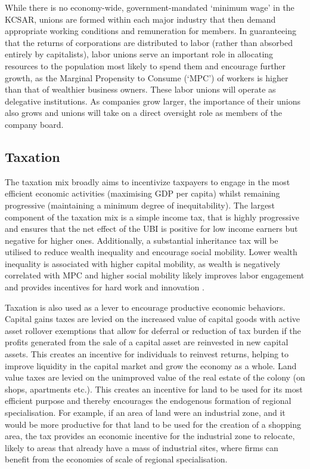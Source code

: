 \documentclass[fleqn,10pt]{Stylesheet} %
\begin{document}
While there is no economy-wide, government-mandated ‘minimum wage’ in the KCSAR, unions are formed within each major industry that then demand appropriate working conditions and remuneration for members. In guaranteeing that the returns of corporations are distributed to labor (rather than absorbed entirely by capitalists), labor unions serve an important role in allocating resources to the population most likely to spend them and encourage further growth, as the Marginal Propensity to Consume (‘MPC’) of workers is higher than that of wealthier business owners. These labor unions will operate as delegative institutions. As companies grow larger, the importance of their unions also grows and unions will take on a direct oversight role as members of the company board. 

\subsection{Taxation}
The taxation mix broadly aims to incentivize taxpayers to engage in the most efficient economic activities (maximising GDP per capita) whilst remaining progressive (maintaining a minimum degree of inequitability). The largest component of the taxation mix is a simple income tax, that is highly progressive and ensures that the net effect of the UBI is positive for low income earners but negative for higher ones. Additionally, a substantial inheritance tax will be utilised to reduce wealth inequality and encourage social mobility. Lower wealth inequality is associated with higher capital mobility, as wealth is negatively correlated with MPC and higher social mobility likely improves labor engagement and provides incentives for hard work and innovation \cite{Brueckner-2018}.

Taxation is also used as a lever to encourage productive economic behaviors. Capital gains taxes are levied on the increased value of capital goods with active asset rollover exemptions that allow for deferral or reduction of tax burden if the profits generated from the sale of a capital asset are reinvested in new capital assets. This creates an incentive for individuals to reinvest returns, helping to improve liquidity in the capital market and grow the economy as a whole. Land value taxes are levied on the unimproved value of the real estate of the colony (on shops, apartments etc.). This creates an incentive for land to be used for its most efficient purpose and thereby encourages the endogenous formation of regional specialisation. For example, if an area of land were an industrial zone, and it would be more productive for that land to be used for the creation of a shopping area, the tax provides an economic incentive for the industrial zone to relocate, likely to areas that already have a mass of industrial sites, where firms can benefit from the economies of scale of regional specialisation.
\end{document}
